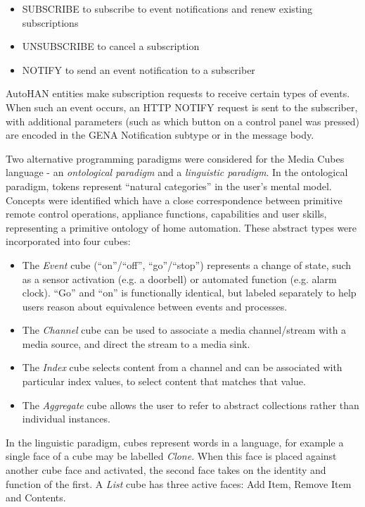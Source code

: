 \begin{itemize}
	\item SUBSCRIBE to subscribe to event notifications and renew existing subscriptions
	\item UNSUBSCRIBE to cancel a subscription
	\item NOTIFY to send an event notification to a subscriber
\end{itemize}

AutoHAN entities make subscription requests to receive certain types of events. When such an event occurs, an HTTP NOTIFY request is sent to the subscriber, with additional parameters (such as which button on a control panel was pressed) are encoded in the \ac{GENA} Notification subtype or in the message body.

Two alternative programming paradigms were considered for the Media Cubes language - an \emph{ontological paradigm} and a \emph{linguistic paradigm}. In the ontological paradigm, tokens represent ``natural categories'' in the user's mental model. Concepts were identified which have a close correspondence between primitive remote control operations, appliance functions, capabilities and user skills, representing a primitive ontology of home automation. These abstract types were incorporated into four cubes:

\begin{itemize}
	\item The \emph{Event} cube (``on''/``off'', ``go''/``stop'') represents a change of state, such as a sensor activation (e.g. a doorbell) or automated function (e.g. alarm clock). ``Go'' and ``on'' is functionally identical, but labeled separately to help users reason about equivalence between events and processes.
	\item The \emph{Channel} cube can be used to associate a media channel/stream with a media source, and direct the stream to a media sink.
	\item The \emph{Index} cube selects content from a channel and can be associated with particular index values, to select content that matches that value. 
	\item The \emph{Aggregate} cube allows the user to refer to abstract collections rather than individual instances.
\end{itemize}

In the linguistic paradigm, cubes represent words in a language, for example a single face of a cube may be labelled \emph{Clone}. When this face is placed against another cube face and activated, the second face takes on the identity and function of the first. A \emph{List} cube has three active faces: Add Item, Remove Item and Contents.


